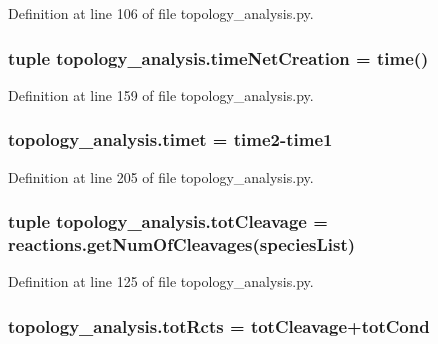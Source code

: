 Definition at line 106 of file topology\+\_\+analysis.\+py.

\hypertarget{a00159_a2f85d448268dd44ad47f66b65bfa45b6}{
\subsubsection[{time\+Net\+Creation}]{\setlength{\rightskip}{0pt plus 5cm}tuple topology\+\_\+analysis.\+time\+Net\+Creation = time()}}\label{a00159_a2f85d448268dd44ad47f66b65bfa45b6}


Definition at line 159 of file topology\+\_\+analysis.\+py.

\hypertarget{a00159_a5b12bbbc66679be171ab082dbaeba90b}{
\subsubsection[{timet}]{\setlength{\rightskip}{0pt plus 5cm}topology\+\_\+analysis.\+timet = {\bf time2}-\/{\bf time1}}}\label{a00159_a5b12bbbc66679be171ab082dbaeba90b}


Definition at line 205 of file topology\+\_\+analysis.\+py.

\hypertarget{a00159_a1e875e49e1f980d461a398fd6a072b0b}{
\subsubsection[{tot\+Cleavage}]{\setlength{\rightskip}{0pt plus 5cm}tuple topology\+\_\+analysis.\+tot\+Cleavage = reactions.\+get\+Num\+Of\+Cleavages({\bf species\+List})}}\label{a00159_a1e875e49e1f980d461a398fd6a072b0b}


Definition at line 125 of file topology\+\_\+analysis.\+py.

\hypertarget{a00159_a059c41eb160321f87ba469fddd20eda7}{
\subsubsection[{tot\+Rcts}]{\setlength{\rightskip}{0pt plus 5cm}topology\+\_\+analysis.\+tot\+Rcts = {\bf tot\+Cleavage}+tot\+Cond}}\label{a00159_a059c41eb160321f87ba469fddd20eda7}


